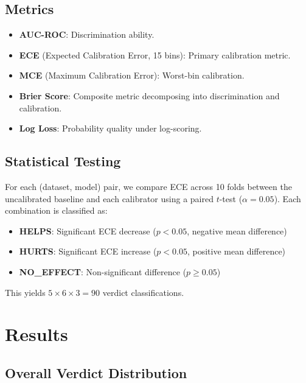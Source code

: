 \documentclass[preprint,12pt]{elsarticle}
\begin{document}
\subsection{Metrics}

\begin{itemize}
    \item \textbf{AUC-ROC}: Discrimination ability.
    \item \textbf{ECE} (Expected Calibration Error, 15 bins): Primary calibration metric.
    \item \textbf{MCE} (Maximum Calibration Error): Worst-bin calibration.
    \item \textbf{Brier Score}: Composite metric decomposing into discrimination and calibration.
    \item \textbf{Log Loss}: Probability quality under log-scoring.
\end{itemize}

\subsection{Statistical Testing}

For each (dataset, model) pair, we compare ECE across 10 folds between the uncalibrated baseline and each calibrator using a paired $t$-test ($\alpha=0.05$). Each combination is classified as:

\begin{itemize}
    \item \textbf{HELPS}: Significant ECE decrease ($p<0.05$, negative mean difference)
    \item \textbf{HURTS}: Significant ECE increase ($p<0.05$, positive mean difference)
    \item \textbf{NO\_EFFECT}: Non-significant difference ($p \geq 0.05$)
\end{itemize}

This yields $5 \times 6 \times 3 = 90$ verdict classifications.

\section{Results}
\label{sec:results}

\subsection{Overall Verdict Distribution}
\end{document}
